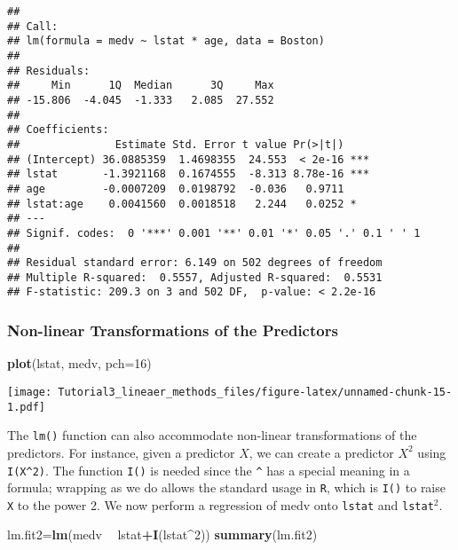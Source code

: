 \documentclass[]{article}
\newenvironment{Shaded}{\begin{snugshade}}{\end{snugshade}}
\newcommand{\KeywordTok}[1]{\textcolor[rgb]{0.13,0.29,0.53}{\textbf{#1}}}
\newcommand{\DataTypeTok}[1]{\textcolor[rgb]{0.13,0.29,0.53}{#1}}
\newcommand{\DecValTok}[1]{\textcolor[rgb]{0.00,0.00,0.81}{#1}}
\newcommand{\StringTok}[1]{\textcolor[rgb]{0.31,0.60,0.02}{#1}}
\newcommand{\OperatorTok}[1]{\textcolor[rgb]{0.81,0.36,0.00}{\textbf{#1}}}
\newcommand{\NormalTok}[1]{#1}
\begin{document}
\begin{verbatim}
## 
## Call:
## lm(formula = medv ~ lstat * age, data = Boston)
## 
## Residuals:
##     Min      1Q  Median      3Q     Max 
## -15.806  -4.045  -1.333   2.085  27.552 
## 
## Coefficients:
##               Estimate Std. Error t value Pr(>|t|)    
## (Intercept) 36.0885359  1.4698355  24.553  < 2e-16 ***
## lstat       -1.3921168  0.1674555  -8.313 8.78e-16 ***
## age         -0.0007209  0.0198792  -0.036   0.9711    
## lstat:age    0.0041560  0.0018518   2.244   0.0252 *  
## ---
## Signif. codes:  0 '***' 0.001 '**' 0.01 '*' 0.05 '.' 0.1 ' ' 1
## 
## Residual standard error: 6.149 on 502 degrees of freedom
## Multiple R-squared:  0.5557, Adjusted R-squared:  0.5531 
## F-statistic: 209.3 on 3 and 502 DF,  p-value: < 2.2e-16
\end{verbatim}

\subsubsection{Non-linear Transformations of the
Predictors}\label{non-linear-transformations-of-the-predictors}

\begin{Shaded}
\begin{Highlighting}[]
\KeywordTok{plot}\NormalTok{(lstat, medv, }\DataTypeTok{pch=}\DecValTok{16}\NormalTok{)}
\end{Highlighting}
\end{Shaded}

\texttt{[image: Tutorial3\_lineaer\_methods\_files/figure-latex/unnamed-chunk-15-1.pdf]}

The \texttt{lm()} function can also accommodate non-linear
transformations of the predictors. For instance, given a predictor
\(X\), we can create a predictor \(X^2\) using \texttt{I(X\^{}2)}. The
function \texttt{I()} is needed since the \texttt{\^{}} has a special
meaning in a formula; wrapping as we do allows the standard usage in
\texttt{R}, which is \texttt{I()} to raise \texttt{X} to the power 2. We
now perform a regression of medv onto \texttt{lstat} and
\texttt{lstat}\(^2\).

\begin{Shaded}
\begin{Highlighting}[]
\NormalTok{lm.fit2=}\KeywordTok{lm}\NormalTok{(medv }\OperatorTok{~}\StringTok{ }\NormalTok{lstat}\OperatorTok{+}\KeywordTok{I}\NormalTok{(lstat}\OperatorTok{^}\DecValTok{2}\NormalTok{)) }
\KeywordTok{summary}\NormalTok{(lm.fit2)}
\end{Highlighting}
\end{Shaded}
\end{document}
